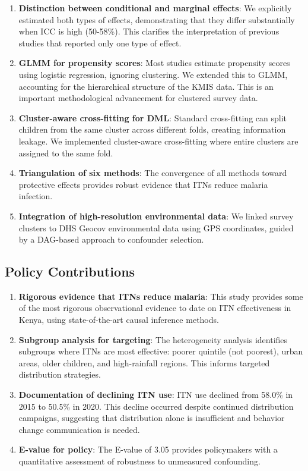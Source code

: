 \begin{enumerate}
	\item \textbf{Distinction between conditional and marginal effects}: We explicitly estimated both types of effects, demonstrating that they differ substantially when ICC is high (50-58\%). This clarifies the interpretation of previous studies that reported only one type of effect.
	
	\item \textbf{GLMM for propensity scores}: Most studies estimate propensity scores using logistic regression, ignoring clustering. We extended this to GLMM, accounting for the hierarchical structure of the KMIS data. This is an important methodological advancement for clustered survey data.
	
	\item \textbf{Cluster-aware cross-fitting for DML}: Standard cross-fitting can split children from the same cluster across different folds, creating information leakage. We implemented cluster-aware cross-fitting where entire clusters are assigned to the same fold.
	
	\item \textbf{Triangulation of six methods}: The convergence of all methods toward protective effects provides robust evidence that ITNs reduce malaria infection.
	
	\item \textbf{Integration of high-resolution environmental data}: We linked survey clusters to DHS Geocov environmental data using GPS coordinates, guided by a DAG-based approach to confounder selection.
\end{enumerate}

\subsection{Policy Contributions}

\begin{enumerate}
	\item \textbf{Rigorous evidence that ITNs reduce malaria}: This study provides some of the most rigorous observational evidence to date on ITN effectiveness in Kenya, using state-of-the-art causal inference methods.
	
	\item \textbf{Subgroup analysis for targeting}: The heterogeneity analysis identifies subgroups where ITNs are most effective: poorer quintile (not poorest), urban areas, older children, and high-rainfall regions. This informs targeted distribution strategies.
	
	\item \textbf{Documentation of declining ITN use}: ITN use declined from 58.0\% in 2015 to 50.5\% in 2020. This decline occurred despite continued distribution campaigns, suggesting that distribution alone is insufficient and behavior change communication is needed.
	
	\item \textbf{E-value for policy}: The E-value of 3.05 provides policymakers with a quantitative assessment of robustness to unmeasured confounding.
\end{enumerate}

